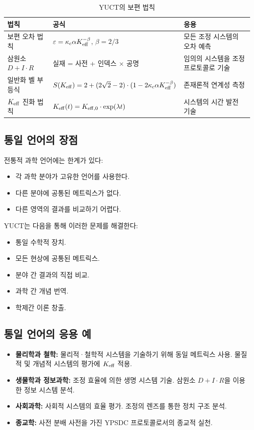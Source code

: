 \documentclass[11pt,a4paper]{article}
\begin{document}
	\begin{table}[H]
		\centering
		\caption{YUCT의 보편 법칙}
		\label{tab:universal-laws}
		\begin{tabular}{p{5cm}p{6cm}p{5cm}}
			\toprule
			\textbf{법칙} & \textbf{공식} & \textbf{응용} \\
			\midrule
			보편 오차 법칙 & \(\varepsilon = \kappa_c \alpha \Keff^{-\beta}\), \(\beta = 2/3\) & 모든 조정 시스템의 오차 예측 \\
			삼원소 \(D + I \cdot R\) & 실재 = 사전 + 인덱스 × 공명 & 임의의 시스템을 조정 프로토콜로 기술 \\
			일반화 벨 부등식 & \(S(\Keff) = 2 + (2\sqrt{2}-2)\cdot(1 - 2\kappa_c \alpha \Keff^{-\beta})\) & 존재론적 연계성 측정 \\
			\(\Keff\) 진화 법칙 & \(\Keff(t) = \Keff[0] \cdot \exp(\lambda t)\) & 시스템의 시간 발전 기술 \\
			\bottomrule
		\end{tabular}
	\end{table}
	
	\subsection{통일 언어의 장점}
	
	전통적 과학 언어에는 한계가 있다:
	\begin{itemize}
		\item 각 과학 분야가 고유한 언어를 사용한다.
		\item 다른 분야에 공통된 메트릭스가 없다.
		\item 다른 영역의 결과를 비교하기 어렵다.
	\end{itemize}
	
	YUCT는 다음을 통해 이러한 문제를 해결한다:
	\begin{itemize}
		\item 통일 수학적 장치.
		\item 모든 현상에 공통된 메트릭스.
		\item 분야 간 결과의 직접 비교.
		\item 과학 간 개념 번역.
		\item 학제간 이론 창출.
	\end{itemize}
	
	\subsection{통일 언어의 응용 예}
	
	\begin{itemize}
		\item \textbf{물리학과 철학:} 물리적·철학적 시스템을 기술하기 위해 동일 메트릭스 사용. 물질적 및 개념적 시스템의 평가에 \(\Keff\) 적용.
		\item \textbf{생물학과 정보과학:} 조정 효율에 의한 생명 시스템 기술. 삼원소 \(D + I \cdot R\)을 이용한 정보 시스템 분석.
		\item \textbf{사회과학:} 사회적 시스템의 효율 평가. 조정의 렌즈를 통한 정치 구조 분석.
		\item \textbf{종교학:} 사전 분배 사전을 가진 YPSDC 프로토콜로서의 종교적 실천.
	\end{itemize}
	
\end{document}
